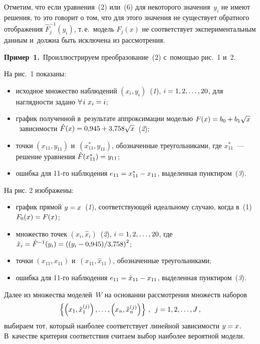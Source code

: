 \begin{multicols}{2}
  Отметим, что если уравнения~(2) или~(6) для некоторого значения~$y_i$ не 
имеют решения, то это говорит о том, что для этого значения не существует 
обратного отображения $\hat{F}_j^{-1}(y_i)$, т.\,е.\ модель $F_j(x)$ не 
соответствует экспериментальным данным и~должна быть исключена из 
рассмотрения.
  
  \smallskip
  
  \noindent
  \textbf{Пример~1.}\ Проиллюстрируем преобразование~(2) с~по\-мощью 
рис.~1 и~2.
  
  На рис.~1 показаны:
  \begin{itemize}
\item  исходное множество наблюдений $(x_i, y_i)$~(\textit{1}), $i\hm= 1,2,\ldots, 20$, для 
наглядности задано $\forall\,i \ x_i\hm=i$;

\item  график полученной в~результате аппроксимации моделью $F(x) \hm= 
b_0\hm+ b_1\sqrt{x}$\ зависимости $\hat{F}(x)\hm= 0{,}945\hm+ 
3{,}758\sqrt{x}$~(\textit{2});

\item  точки $(x_{11}, y_{11})$ и~$(x_{11}^*, y_{11})$, обозначенные 
треугольниками, где $x_{11}^*$~--- решение уравнения 
$\hat{F}(x^*_{11})\hm= y_{11}$;

\item  ошибка для 11-го наблюдения $e_{11}\hm= x^*_{11}\hm- x_{11}$, 
выделенная пунктиром~(\textit{3}).
\end{itemize}

  На рис. 2 изображены:
  \begin{itemize}
\item график прямой $y\hm=x$~(\textit{1}), соответствующей идеальному случаю, когда 
в~(1) $F_0(x)\hm= F(x)$;
\item множество точек $(x_i, \hat{x}_i)$~(\textit{2}), $i\hm= 1,2,\ldots, 20$, где 
$\hat{x}_i\hm= \hat{F}^{-1}(y_i)\hm= \left( (y_i-0{,}945)/3{,}758\right)^2$;
\item точки $(x_{11}, x_{11})$ и~$(x_{11}, \hat{x}_{11})$, обозначенные 
треугольниками;
\item ошибка для 11-го наблюдения $e_{11}\hm= \hat{x}_{11}\hm- x_{11}$, 
выделенная пунктиром~(\textit{3}).
  \end{itemize}


  
  Далее из множества моделей~$W$ на основании рассмотрения множеств 
наборов
  \begin{equation}
  \left\{ \left( x_1,\hat{x}_1^{(j)}\right),\ldots, \left(x_n, 
\hat{x}_n^{(j)}\right)\right\}\,,\enskip j=1,2,\ldots, J\,,
  \label{e7-t}
  \end{equation}
выбираем тот, который наиболее соответствует линейной зависимости  
$y\hm=x$. В~качестве критерия соответствия считаем выбор наиболее 
вероятной модели.
  

\end{multicols}
